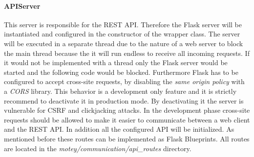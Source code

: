 \paragraph{APIServer} This server is responsible for the \ac{REST} \ac{API}.
Therefore the Flask server will be instantiated and configured in the constructor of the wrapper class.
The server will be executed in a separate thread due to the nature of a web server to block the main thread because the it will run endless to receive all incoming requests.
If it would not be implemented with a thread only the Flask server would be started and the following code would be blocked.
Furthermore Flask has to be configured to accept cross-site requests, by disabling the \textit{same origin policy} with a \textit{\ac{CORS}} library.
This behavior is a development only feature and it is strictly recommend to deactivate it in production mode.
By deactivating it the server is vulnerable for \ac{CSRF} and clickjacking attacks.
In the development phase cross-site requests should be allowed to make it easier to communicate between a web client and the \ac{REST} \ac{API}.
In addition all the configured \ac{API} will be initialized.
As mentioned before these routes can be implemented as Flask Blueprints.
All routes are located in the \textit{motey/communication/api\_routes} directory.\newline

